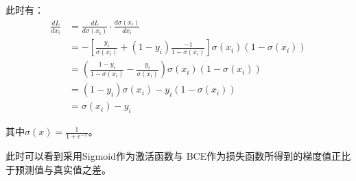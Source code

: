 此时有：
\begin{equation}
	\begin{aligned}
		\frac{d L}{d x_{i}} & =\frac{d L}{d \sigma\left(x_{i}\right)} \cdot \frac{d \sigma\left(x_{i}\right)}{d x_{i}}                                                                                         \\
		                    & =-\left[\frac{y_{i}}{\sigma\left(x_{i}\right)}+\left(1-y_{i}\right) \frac{-1}{1-\sigma\left(x_{i}\right)}\right] \sigma\left(x_{i}\right)\left(1-\sigma\left(x_{i}\right)\right) \\
		                    & =\left(\frac{1-y_{i}}{1-\sigma\left(x_{i}\right)}-\frac{y_{i}}{\sigma\left(x_{i}\right)}\right) \sigma\left(x_{i}\right)\left(1-\sigma\left(x_{i}\right)\right)                  \\
		                    & =\left(1-y_{i}\right) \sigma\left(x_{i}\right)-y_{i}\left(1-\sigma\left(x_{i}\right)\right)                                                                                      \\
		                    & =\sigma\left(x_{i}\right)-y_{i}
	\end{aligned}
\end{equation}

其中$ \sigma(x)=\frac{1}{1+e^{-x}} $。

此时可以看到采用Sigmoid作为激活函数与
BCE作为损失函数所得到的梯度值正比于预测值与真实值之差。